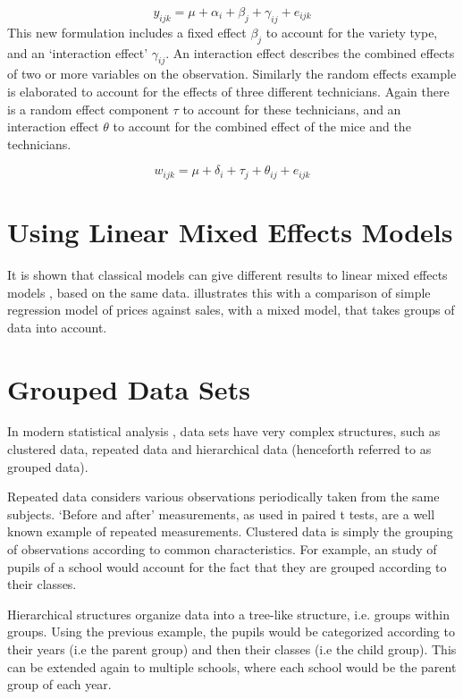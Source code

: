 \documentclass[12pt, a4paper]{report}
\theoremstyle{plain}
\theoremstyle{definition}
\theoremstyle{remark}
\begin{document}
\begin{equation}
y_{ijk} = \mu + \alpha_{i} + \beta_{j} + \gamma_{ij} + e_{ijk}
\end{equation}
This new formulation includes a fixed effect $\beta_{j}$ to
account for the variety type, and an `interaction effect'
$\gamma_{ij}$. An interaction effect describes the combined
effects of two or more variables on the observation. Similarly the
random effects example is elaborated to account for the effects of
three different technicians. Again there is a random effect
component $\tau$ to account for these technicians, and an
interaction effect $\theta$ to account for the combined effect of
the mice and the technicians.

\begin{equation}
w_{ijk} = \mu + \delta_{i} + \tau_{j} + \theta_{ij} + e_{ijk}
\end{equation}

\section{Using Linear Mixed Effects Models} It is shown that
classical models can give different results to linear mixed
effects models , based on the same data. \citet{Demi} illustrates
this with a comparison of simple regression model of prices
against sales, with a mixed model, that takes groups of data into
account.
\newpage

\section{Grouped Data Sets}
In modern statistical analysis , data sets have very complex
structures, such as  clustered data, repeated data and
hierarchical data (henceforth referred to as grouped data).

Repeated data considers various observations periodically taken
from the same subjects. `Before and after' measurements, as used
in paired t tests, are a well known example of repeated
measurements. Clustered data is simply the grouping of
observations according to common characteristics. For example, an
study of pupils of a school would account for the fact that they
are grouped according to their classes.

Hierarchical structures organize data into a tree-like structure,
i.e. groups within groups. Using the previous example, the pupils
would be categorized according to their years (i.e the parent
group) and then their classes (i.e the child group). This can be
extended again to multiple schools, where each school would be the
parent group of each year.
\end{document}
